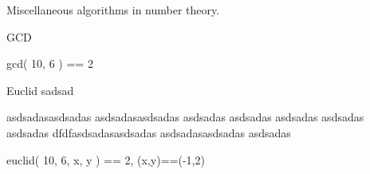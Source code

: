 
\begin{desc}
Miscellaneous algorithms in number theory.
\end{desc}

\begin{algorithm}{GCD}
\characteristics{}
\begin{example}
	gcd( 10, 6 ) == 2
\end{example}
\end{algorithm}


\begin{algorithm}{Euclid}
sadsad

asdsadasasdsadas asdsadasasdsadas asdsadas asdsadas asdsadas asdsadas asdsadas
dfdfasdsadasasdsadas asdsadasasdsadas asdsadas

\begin{example}
	euclid( 10, 6, x, y ) == 2, (x,y)==(-1,2)
\end{example}
\end{algorithm}
